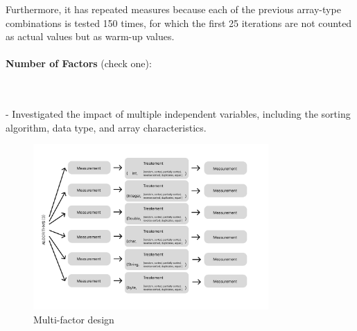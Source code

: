 \documentclass{article}
\begin{document}
Furthermore, it has repeated measures because each of the previous array-type combinations is tested 150 times, for which the first 25 iterations are not counted as actual values but as warm-up values.
\\\\
\textbf{Number of Factors} (check one):\\
\noindent
\begin{minipage}{0.4\textwidth}
\end{minipage}%
\begin{minipage}{0.4\textwidth}
\end{minipage}%
\begin{minipage}{0.0\textwidth}
\end{minipage}\\\\
- Investigated the impact of multiple independent variables, including the sorting algorithm, data type, and array characteristics.
\begin{figure}[H]
    \centering
    \includegraphics[width=0.8\textwidth]{./data/Group12.png}
    \caption{Multi-factor design}
\end{figure}
\end{document}
